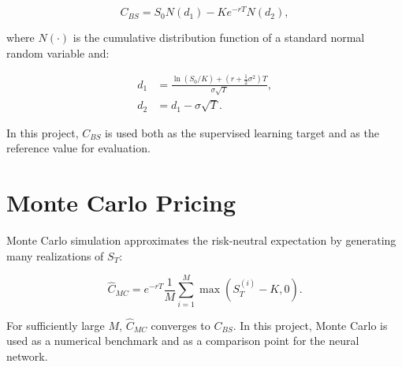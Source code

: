 \begin{equation}
    C_{BS} = S_0 N(d_1) - K e^{-rT} N(d_2),
\end{equation}

where $N(\cdot)$ is the cumulative distribution function of a standard normal random variable and:

\begin{align}
    d_1 &= \frac{\ln(S_0/K) + \left(r + \frac{1}{2}\sigma^2\right)T}{\sigma\sqrt{T}}, \\
    d_2 &= d_1 - \sigma\sqrt{T}.
\end{align}

In this project, $C_{BS}$ is used both as the supervised learning target and as the reference value for evaluation.

\section{Monte Carlo Pricing}

Monte Carlo simulation approximates the risk-neutral expectation by generating many realizations of $S_T$:

\begin{equation}
    \hat{C}_{MC} =
    e^{-rT}
    \frac{1}{M}
    \sum_{i=1}^{M}
    \max(S_T^{(i)} - K, 0).
\end{equation}

For sufficiently large $M$, $\hat{C}_{MC}$ converges to $C_{BS}$.
In this project, Monte Carlo is used as a numerical benchmark and as a comparison point for the neural network.
